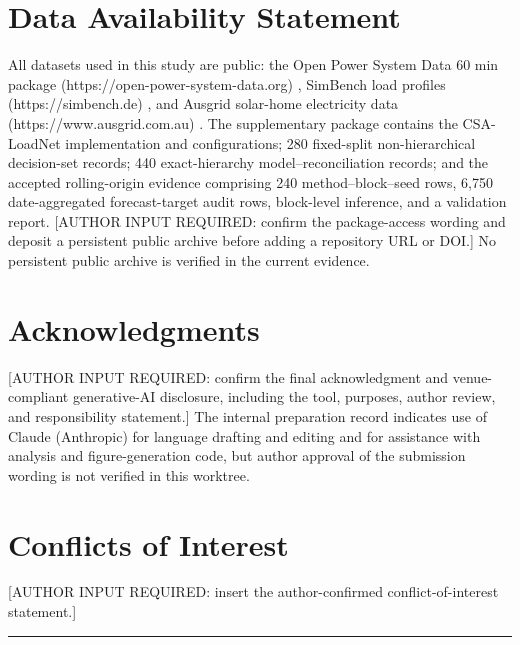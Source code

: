 \documentclass[electronics,article,submit,moreauthors]{Definitions/mdpi}
\begin{document}
\section*{Data Availability Statement}

All datasets used in this study are public: the Open Power System Data 60 min package (https://open-power-system-data.org) \cite{ref29}, SimBench load profiles (https://simbench.de) \cite{ref30}, and Ausgrid solar-home electricity data (https://www.ausgrid.com.au) \cite{ref24}. The supplementary package contains the CSA-LoadNet implementation and configurations; 280 fixed-split non-hierarchical decision-set records; 440 exact-hierarchy model--reconciliation records; and the accepted rolling-origin evidence comprising 240 method--block--seed rows, 6,750 date-aggregated forecast-target audit rows, block-level inference, and a validation report. {[}AUTHOR INPUT REQUIRED: confirm the package-access wording and deposit a persistent public archive before adding a repository URL or DOI.{]} No persistent public archive is verified in the current evidence.

\section*{Acknowledgments}

{[}AUTHOR INPUT REQUIRED: confirm the final acknowledgment and venue-compliant generative-AI disclosure, including the tool, purposes, author review, and responsibility statement.{]} The internal preparation record indicates use of Claude (Anthropic) for language drafting and editing and for assistance with analysis and figure-generation code, but author approval of the submission wording is not verified in this worktree.

\section*{Conflicts of Interest}

{[}AUTHOR INPUT REQUIRED: insert the author-confirmed conflict-of-interest statement.{]}

\begin{center}\rule{0.5\linewidth}{0.5pt}\end{center}
\end{document}
